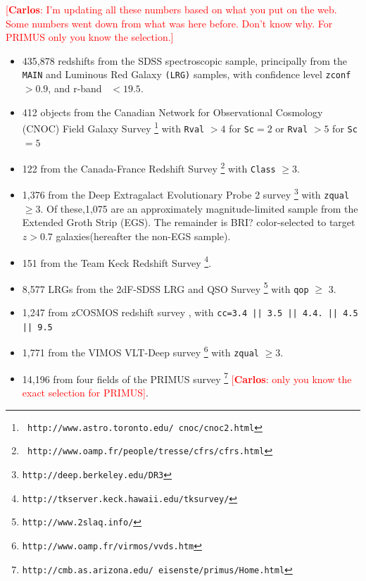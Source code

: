 \documentclass[preprint]{aastex}
\newcommand{\cc}[1]{\textcolor{red}{[{\bf Carlos}: #1]}}
\begin{document}
\cc{I'm updating all these numbers based on what you put on the web. Some numbers went down from what was here before. Don't know why. For PRIMUS only you know the selection.}
\begin{itemize} 

    \item 435,878 redshifts from the SDSS spectroscopic sample,
principally from the \texttt{MAIN} and Luminous Red Galaxy \texttt{(LRG)}
samples, with confidence level \texttt{zconf}$ > 0.9$, and r-band
\cmodelmag\ $ <19.5$.


    \item 412 objects from the Canadian Network for Observational
Cosmology (CNOC) Field Galaxy Survey \cite[CNOC2;][]{yee00}\footnote{\tt
http://www.astro.toronto.edu/~cnoc/cnoc2.html} with \texttt{Rval} $>4$
for \texttt{Sc}$=2$ or \texttt{Rval} $> 5$ for \texttt{Sc}$=5$

    \item 122 from the Canada-France Redshift
Survey \cite[CFRS;][]{lilly95}\footnote{\tt
http://www.oamp.fr/people/tresse/cfrs/cfrs.html} with \texttt{Class} $\geq 3$.

    \item 1,376 from the Deep Extragalact Evolutionary Probe 2 survey
\citep[DEEP2;][]{weiner05}\footnote{\tt http://deep.berkeley.edu/DR3}
with \texttt{zqual} $\geq 3$. 
Of these,1,075 are an approximately magnitude-limited sample from the Extended Groth Strip (EGS).
The remainder is BRI? color-selected to target $z>0.7$ galaxies(hereafter the non-EGS sample). 

    \item 151 from the Team Keck Redshift Survey \cite[TKRS;][]{wirth04}\footnote{\tt http://tkserver.keck.hawaii.edu/tksurvey/}.

    \item 8,577 LRGs from the 2dF-SDSS LRG and QSO Survey \cite[2SLAQ;][]{cannon06}\footnote{\tt http://www.2slaq.info/} with \texttt{qop} $\geq$ 3.

    \item  1,247 from zCOSMOS redshift survey \cite{lilly07}, with  \texttt{cc=3.4 || 3.5 || 4.4.  || 4.5 || 9.5}
    
    \item 1,771 from the VIMOS VLT-Deep survey \cite[VVDS;][]{garilli08}\footnote{\tt http://www.oamp.fr/virmos/vvds.htm} with \texttt{zqual} $\geq 3$.

    \item 14,196 from four fields of the PRIMUS survey \cite[PRIMUS;][]{coil10}\footnote{\tt http://cmb.as.arizona.edu/~eisenste/primus/Home.html} \cc{only you know the exact selection for PRIMUS}.
      
\end{itemize}
\end{document}

